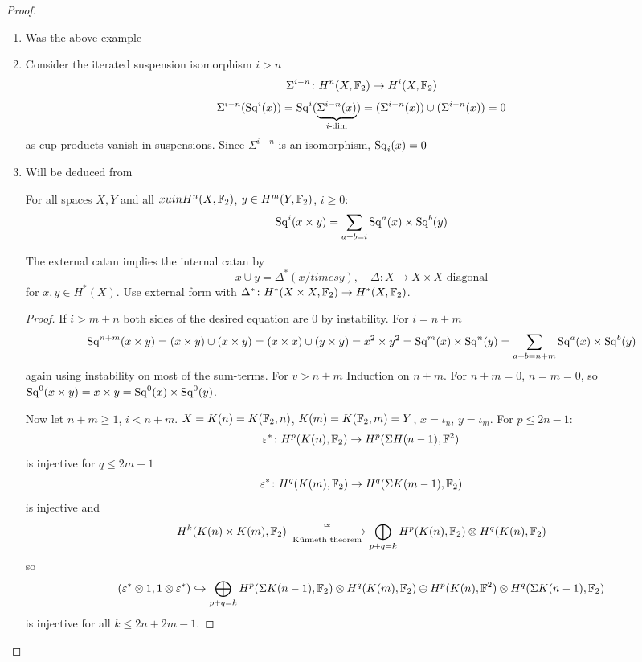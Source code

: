 \documentclass[language=english]{TemplateLecture}
\begin{document}
\begin{proof}
    \begin{enumerate}
        \item Was the above example
        \item Consider the iterated suspension isomorphism \(i> n\)
        \[\Sigma^{i-n}\colon H^n(X, \mathbb{F}_2) \to H^i(X, \mathbb{F}_2)\]
        \[\Sigma^{i-n}(\mathrm{Sq}^i(x)) = \mathrm{Sq}^i(\underbrace{\Sigma^{i-n}(x)}_{i\text{-dim}}) = (\Sigma^{i-n}(x))\cup (\Sigma^{i-n}(x)) = 0\]
        as cup products vanish in suspensions. Since \(\Sigma^{i-n}\) is an isomorphism, \(\mathrm{Sq}_i(x)= 0\)
        \item Will be deduced from
        \begin{proposition}
            For all spaces \(X,Y\) and all \(x uin H^n(X, \mathbb{F}_2)\), \(y\in H^m(Y, \mathbb{F}_2)\), \(i\geq 0\):
            \[\mathrm{Sq}^i(x\times y) = \sum_{a+b = i} \mathrm{Sq}^a(x)\times \mathrm{Sq}^b(y)\]
        \end{proposition}
        The external catan implies the internal catan by
        \[x\cup y = \Delta^*(x/times y), \quad \Delta\colon X\to X\times X\text{ diagonal}\]
        for \(x,y \in H^*(X)\). Use external form with \(\Delta^*\colon H^*(X\times X, \mathbb{F}_2)\to H^*(X, \mathbb{F}_2)\).

        \begin{proof}
            If \(i> m+n\) both sides of the desired equation are 0 by instability. For \(i = n+m\)
            \[\mathrm{Sq}^{n+m}(x\times y) = (x\times y)\cup (x\times y) = (x\times x)\cup (y\times y) = x^2 \times y^2 = \mathrm{Sq}^m(x)\times \mathrm{Sq}^n(y) = \sum_{a+b=n+m} \mathrm{Sq}^a(x) \times \mathrm{Sq}^b(y)\]
            again using instability on most of the sum-terms. For \(v>n+m\) Induction on \(n+m\). For \(n+m = 0\), \(n= m=0\), so \(\mathrm{Sq}^0(x\times y) = x\times y = \mathrm{Sq}^0(x)\times \mathrm{Sq}^0(y)\).

            Now let \(n+m \geq 1\), \(i<n+m\). \(X= K(n) = K(\mathbb{F}_2, n)\), \(K(m) = K(\mathbb{F}_2, m) = Y\), \(x = \iota_n\), \(y = \iota_m\). For \(p \leq 2n-1\):
            \[\varepsilon^*\colon H^p(K(n), \mathbb{F}_2) \to H^p(\Sigma H(n-1), \mathbb{F}^2)\]
            is injective for \(q \leq 2m -1\)
            \[\varepsilon^*\colon H^q(K(m), \mathbb{F}_2)\to H^q(\Sigma K(m-1), \mathbb{F}_2)\]
            is injective and
            \[H^k(K(n)\times K(m), \mathbb{F}_2)\xrightarrow[\text{Künneth theorem}]{\cong}\bigoplus_{p+q = k} H^p(K(n), \mathbb{F}_2)\otimes H^q(K(n), \mathbb{F}_2)\]
            so
            \[(\varepsilon^*\otimes 1, 1\otimes \varepsilon^*)\hookrightarrow \bigoplus_{p+q = k} H^p(\Sigma K(n-1), \mathbb{F}_2)\otimes H^q(K(m), \mathbb{F}_2)\oplus H^p(K(n), \mathbb{F}^2)\otimes H^q(\Sigma K(n-1), \mathbb{F}_2)\]
            is injective for all \(k\leq 2n+2m-1\).


\end{proof}
\end{enumerate}
\end{proof}
\end{document}
